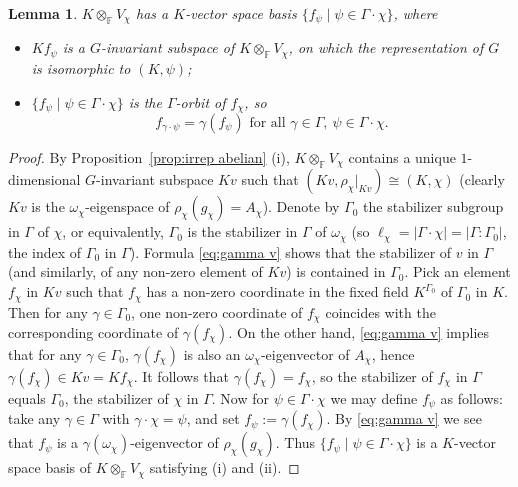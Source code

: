 \documentclass[12pt, oneside]{amsart}
\newtheorem{lemma}[theorem]{\bf Lemma}
\def\field{K}
\def\FF{\mathbb{F}}
\begin{document}
\begin{lemma}\label{lemma:f_psi}
$\field\otimes_\FF V_\chi$ has a $\field$-vector space basis 
$\{f_\psi\mid \psi\in \Gamma\cdot \chi\}$, where 
\begin{itemize}
\item[(i)] $\field f_\psi$ is a $G$-invariant subspace of $\field\otimes_\FF V_\chi$,  
on which the representation of $G$ is isomorphic to 
$(\field,\psi)$; 
\item[(ii)] 
$\{f_\psi\mid \psi\in \Gamma\cdot \chi\}$ is the $\Gamma$-orbit of 
$f_\chi$, so 
\begin{equation}\label{eq:gamma f} f_{\gamma\cdot \psi}=\gamma(f_\psi)\text{ for all }
\gamma\in \Gamma,\  
\psi\in \Gamma\cdot\chi.
\end{equation}  
\end{itemize} 
\end{lemma}
\begin{proof}
By Proposition~\ref{prop:irrep abelian} (i), $\field\otimes_\FF V_\chi$ contains a unique 
$1$-dimensional $G$-invariant subspace $\field v$ such that 
$(\field v,\rho_{\chi}\vert_{\field v})\cong (\field,\chi)$ (clearly $\field v$ is the $\omega_\chi$-eigenspace of 
$\rho_\chi(g_\chi)=A_\chi$). 
Denote by $\Gamma_0$ the stabilizer subgroup in $\Gamma$ of $\chi$, or equivalently, $\Gamma_0$ is the stabilizer in $\Gamma$ 
of $\omega_\chi$  
(so $\ell_\chi=|\Gamma\cdot \chi|=|\Gamma:\Gamma_0|$, the index of $\Gamma_0$ in $\Gamma$). 
Formula \eqref{eq:gamma v} shows that the stabilizer of $v$ in $\Gamma$ (and similarly, of any non-zero element of $\field v$) 
is contained in $\Gamma_0$. 
Pick an element $f_\chi$ in $\field v$ such that $f_\chi$ has a non-zero coordinate in the fixed field 
$\field^{\Gamma_0}$ of $\Gamma_0$ in $\field$. 
Then for any $\gamma\in \Gamma_0$, one non-zero coordinate of $f_\chi$ coincides with the corresponding coordinate of 
$\gamma(f_\chi)$. On the other hand,   \eqref{eq:gamma v} implies that for any $\gamma\in \Gamma_0$, 
$\gamma(f_\chi)$ is also an $\omega_\chi$-eigenvector of $A_\chi$, hence 
$\gamma(f_\chi)\in \field v=\field f_\chi$. It follows that $\gamma(f_\chi)=f_\chi$, so 
the stabilizer of $f_\chi$ in $\Gamma$ equals $\Gamma_0$, the stabilizer of $\chi$ in $\Gamma$. 
Now for $\psi\in \Gamma\cdot \chi$ we may define  $f_\psi$ as follows: take any $\gamma\in \Gamma$ with $\gamma\cdot \chi=\psi$, 
and set $f_\psi:=\gamma(f_\chi)$. By \eqref{eq:gamma v} we see that $f_\psi$ is a $\gamma(\omega_\chi)$-eigenvector of 
$\rho_\chi(g_\chi)$.  
Thus $\{f_\psi\mid \psi\in \Gamma\cdot \chi\}$ is a $\field$-vector space basis of $\field\otimes_\FF V_\chi$ 
satisfying (i) and (ii).  
\end{proof} 
\end{document}
